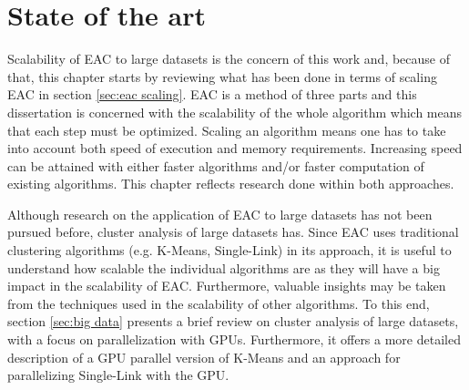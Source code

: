 
\chapter{State of the art}
\label{chapter:stateofart}




Scalability of EAC to large datasets is the concern of this work and, because of that, this chapter starts by reviewing what has been done in terms of scaling EAC in section \ref{sec:eac scaling}.
EAC is a method of three parts and this dissertation is concerned with the scalability of the whole algorithm which means that each step must be optimized.
Scaling an algorithm means one has to take into account both speed of execution and memory requirements.
Increasing speed can be attained with either faster algorithms and/or faster computation of existing algorithms.
This chapter reflects research done within both approaches.


Although research on the application of EAC to large datasets has not been pursued before, cluster analysis of large datasets has. 
Since EAC uses traditional clustering algorithms (e.g. K-Means, Single-Link) in its approach, it is useful to understand how scalable the individual algorithms are as they will have a big impact in the scalability of EAC.
Furthermore, valuable insights may be taken from the techniques used in the scalability of other algorithms.
To this end, section \ref{sec:big data} presents a brief review on cluster analysis of large datasets, with a focus on parallelization with GPUs.
Furthermore, it offers a more detailed description of a GPU parallel version of K-Means and an approach for parallelizing Single-Link with the GPU.

